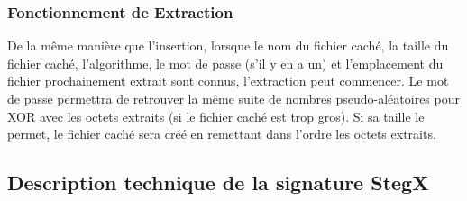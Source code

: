 \documentclass[11pt]{article}
\begin{document}
\subsubsection{Fonctionnement de Extraction}

De la même manière que l'insertion, lorsque le nom du fichier caché, la taille 
du fichier caché, l'algorithme, le mot de passe (s'il y en a un) et l'emplacement
du fichier prochainement extrait sont connus, l'extraction peut commencer. 
Le mot de passe permettra de retrouver la même suite de nombres pseudo-aléatoires 
pour XOR avec les octets extraits (si le fichier caché est trop gros). 
Si sa taille le permet, le fichier caché sera créé en remettant dans l'ordre 
les octets extraits. 

\subsection{Description technique de la signature StegX}
\end{document}
